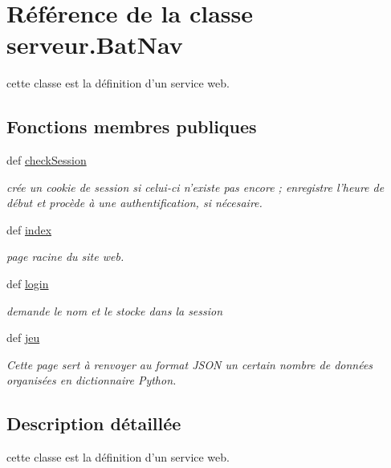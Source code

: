 \hypertarget{classserveur_1_1BatNav}{\section{Référence de la classe serveur.\-Bat\-Nav}
\label{classserveur_1_1BatNav}
}


cette classe est la définition d'un service web.  


\subsection*{Fonctions membres publiques}
\begin{DoxyCompactItemize}
\item 
def \hyperlink{classserveur_1_1BatNav_a4bee30dcf9c6439b0120b0f84e351c8e}{check\-Session}
\begin{DoxyCompactList}\small\item\em crée un cookie de session si celui-\/ci n'existe pas encore ; enregistre l'heure de début et procède à une authentification, si nécesaire. \end{DoxyCompactList}\item 
def \hyperlink{classserveur_1_1BatNav_a788dcf39ae9210eece7d5a1ee4ea593e}{index}
\begin{DoxyCompactList}\small\item\em page racine du site web. \end{DoxyCompactList}\item 
def \hyperlink{classserveur_1_1BatNav_afb6d70a94f46205136428435bffdc442}{login}
\begin{DoxyCompactList}\small\item\em demande le nom et le stocke dans la session \end{DoxyCompactList}\item 
def \hyperlink{classserveur_1_1BatNav_a2e39322808163b8d156562e198518ccf}{jeu}
\begin{DoxyCompactList}\small\item\em Cette page sert à renvoyer au format J\-S\-O\-N un certain nombre de données organisées en dictionnaire Python. \end{DoxyCompactList}\end{DoxyCompactItemize}


\subsection{Description détaillée}
cette classe est la définition d'un service web. 

